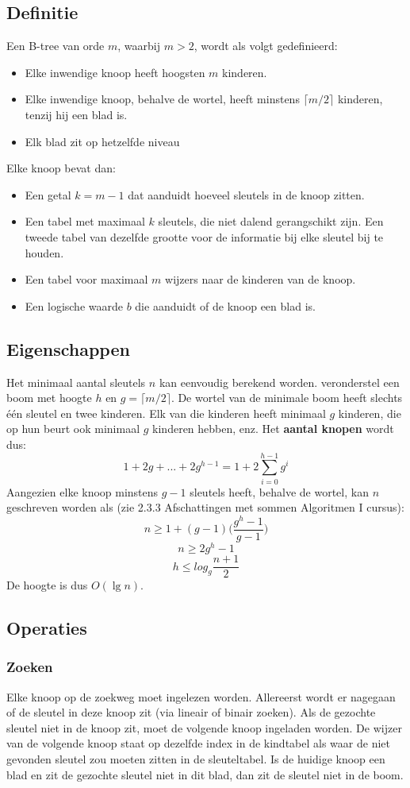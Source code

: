 \documentclass{report}
\begin{document}
 	\subsection{Definitie}
 	Een B-tree van orde $m$, waarbij $m > 2$, wordt als volgt gedefinieerd:
 	\begin{itemize}
 		\item Elke inwendige knoop heeft hoogsten $m$ kinderen.
 		\item Elke inwendige knoop, behalve de wortel, heeft minstens $\lceil m/2 \rceil$ kinderen, tenzij hij een blad is.
 		\item Elk blad zit op hetzelfde niveau
 	\end{itemize} 
    Elke knoop bevat dan:
    \begin{itemize}
    	\item Een getal $k = m - 1$ dat aanduidt hoeveel sleutels in de knoop zitten.
    	\item Een tabel met maximaal $k$ sleutels, die niet dalend gerangschikt zijn. Een tweede tabel van dezelfde grootte voor de informatie bij elke sleutel bij te houden. 
    	\item Een tabel voor maximaal $m$ wijzers naar de kinderen van de knoop. 
    	\item Een logische waarde $b$ die aanduidt of de knoop een blad is.
    \end{itemize}
	\subsection{Eigenschappen}
	Het minimaal aantal sleutels $n$ kan eenvoudig berekend worden. veronderstel een boom met hoogte $h$ en $g = \lceil m/2 \rceil$. De wortel van de minimale boom heeft slechts één sleutel en twee kinderen. Elk van die kinderen heeft minimaal $g$ kinderen, die op hun beurt ook minimaal $g$ kinderen hebben, enz. Het \textbf{aantal knopen} wordt dus:
	$$1 + 2g + ... + 2g^{h - 1} = 1 + 2 \sum_{i = 0}^{h - 1} g^i$$
	Aangezien elke knoop minstens $g - 1$ sleutels heeft, behalve de wortel, kan $n$ geschreven worden als (zie 2.3.3 Afschattingen met sommen Algoritmen I cursus):
	$$n \geq 1 + (g - 1)\bigg(\frac{g^h - 1}{g - 1}\bigg)$$
	$$n \geq 2g^h - 1$$
	$$h \leq log_{g} \frac{n + 1}{2}$$
	De hoogte is dus $O(\lg n)$.
	\subsection{Operaties}
	\subsubsection{Zoeken}
	Elke knoop op de zoekweg moet ingelezen worden. Allereerst wordt er nagegaan of de sleutel in deze knoop zit (via lineair of binair zoeken). Als de gezochte sleutel niet in de knoop zit, moet de volgende knoop ingeladen worden. De wijzer van de volgende knoop staat op dezelfde index in de kindtabel als waar de niet gevonden sleutel zou moeten zitten in de sleuteltabel. Is de huidige knoop een blad en zit de gezochte sleutel niet in dit blad, dan zit de sleutel niet in de boom. 
\end{document}
